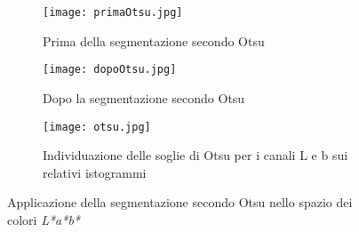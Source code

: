 \begin{figure}[h!]

  \centering
  
  \begin{subfigure}[b]{0.4\textwidth}
    \texttt{[image: primaOtsu.jpg]}
    \caption{Prima della segmentazione secondo Otsu}
  \end{subfigure}
  \begin{subfigure}[b]{0.4\textwidth}
    \texttt{[image: dopoOtsu.jpg]}
    \caption{Dopo la segmentazione secondo Otsu}
  \end{subfigure}
  
  \vspace{5mm}
  
  \begin{subfigure}[b]{0.5\textwidth}
  \centering
    \texttt{[image: otsu.jpg]}
    \caption{Individuazione delle soglie di Otsu per i canali L e b sui relativi istogrammi}
  \end{subfigure}
  
  \caption{Applicazione della segmentazione secondo Otsu nello spazio dei colori \textit{L*a*b*}}
  \label{fig:otsu1}
\end{figure}

